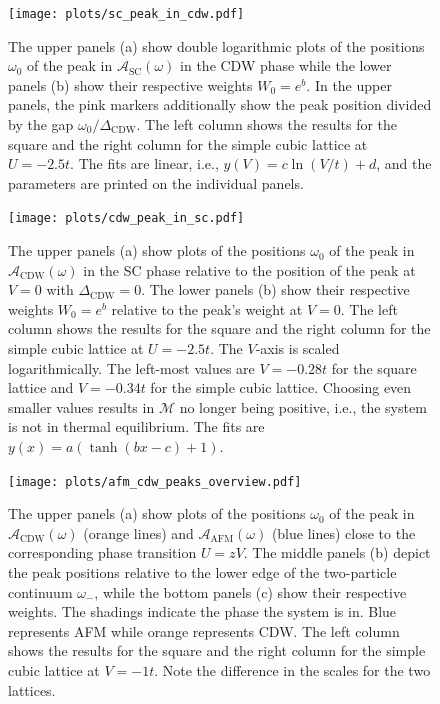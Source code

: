 \documentclass[
    reprint, 
    aps,
    preprintnumbers,
    twocolumn,
    prb,
    superscriptaddress
]{revtex4-2}
\newcommand{\spectral}[1]{\mathcal{A}_\text{#1}  (\omega)}
\begin{document}
\begin{figure}
    \centering
    \texttt{[image: plots/sc\_peak\_in\_cdw.pdf]}
    \caption{The upper panels (a) show double logarithmic plots of the positions $\omega_0$ of the peak in $\spectral{SC}$ in the CDW phase while the lower panels (b) show their respective weights $W_0 = e^{b}$.
    In the upper panels, the pink markers additionally show the peak position divided by the gap $\omega_0 / \Delta_\text{CDW}$.
    The left column shows the results for the square and the right column for the simple cubic lattice at $U=-2.5t$.
    The fits are linear, i.e., $y(V) = c \ln(V/t) + d$, and the parameters are printed on the individual panels.}
    \label{fig:sc_in_cdw_behavior}
\end{figure}

\begin{figure}
    \centering
    \texttt{[image: plots/cdw\_peak\_in\_sc.pdf]}
    \caption{The upper panels (a) show plots of the positions $\omega_0$ of the peak in $\spectral{CDW}$ in the SC phase relative to the position of the peak at $V=0$ with $\Delta_\text{CDW} = 0$.
    The lower panels (b) show their respective weights $W_0 = e^{b}$ relative to the peak's weight at $V=0$.
    The left column shows the results for the square and the right column for the simple cubic lattice at $U=-2.5t$.
    The $V$-axis is scaled logarithmically.
    The left-most values are $V=-0.28t$ for the square lattice and $V=-0.34t$ for the simple cubic lattice.
    Choosing even smaller values results in $\mathcal{M}$ no longer being positive, i.e., the system is not in thermal equilibrium.
    The fits are $y(x) = a (\tanh (bx - c) + 1)$.}
    \label{fig:cdw_in_sc_behavior}
\end{figure}

\begin{figure}
    \centering
    \texttt{[image: plots/afm\_cdw\_peaks\_overview.pdf]}
    \caption{The upper panels (a) show plots of the positions $\omega_0$ of the peak in $\spectral{CDW}$ (orange lines) and $\spectral{AFM}$ (blue lines) close to the corresponding phase transition $U = zV$.
    The middle panels (b) depict the peak positions relative to the lower edge of the two-particle continuum $\omega_-$, while the bottom panels (c) show their respective weights.
    The shadings indicate the phase the system is in. Blue represents AFM while orange represents CDW.
    The left column shows the results for the square and the right column for the simple cubic lattice at $V=-1t$.
    Note the difference in the scales for the two lattices.}
    \label{fig:afm_cdw_peaks_overview}
\end{figure}
\end{document}
